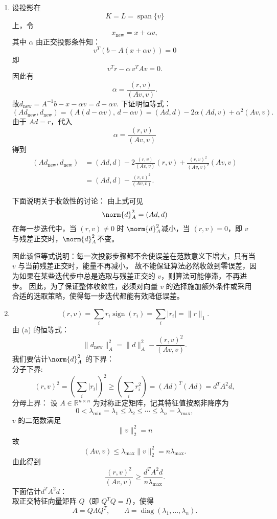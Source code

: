 \documentclass{ctexart}
\begin{document}
\begin{solution}
  \begin{enumerate}
\item 设投影在
\[
K = L = \operatorname{span}\{v\}
\]
上，令
\[
x_{\text{new}} = x + \alpha v,
\]
其中 \(\alpha\) 由正交投影条件知：
\[
v^{T}(b - A(x + \alpha v)) = 0
\]
即\[
v^{T}r - \alpha\, v^{T}Av = 0.
\]
因此有
\[
\alpha = \frac{(r, v)}{(Av, v)}.
\]
故\(d_{\text{new}}=A^{-1} b -x - \alpha v=d-\alpha v \).
下证明恒等式：
\[
(Ad_{\text{new}}, d_{\text{new}})
= (A(d - \alpha v),\, d - \alpha v)
= (Ad, d) - 2\alpha(Ad, v) + \alpha^2 (Av, v).
\]
由于 \(Ad = r\)，代入
\[
\alpha = \frac{(r, v)}{(Av, v)}
\]
得到
\[
\begin{aligned}
(Ad_{\text{new}}, d_{\text{new}})
&= (Ad, d) - 2 \frac{(r, v)}{(Av, v)} (r, v) + \frac{(r, v)^2}{(Av, v)^2} (Av, v) \\[6pt]
&= (Ad, d) - \frac{(r, v)^2}{(Av, v)}.
\end{aligned}
\]

下面说明关于收敛性的讨论：
由上式可见
\[
\norm{d} _A^2 = (Ad, d)
\]
在每一步迭代中，当 \((r, v) \neq 0\) 时 \(\norm{d}_{A}^2  \)减小，当 \((r, v) = 0\)，即 \(v\) 与残差正交时，\(\norm{d}_A^2 \)不变。

因此该恒等式说明：每一次投影步骤都不会使误差在范数意义下增大，只有当 \(v\) 与当前残差正交时，能量不再减小。
故不能保证算法必然收敛到零误差，因为如果在某些迭代步中总是选取与残差正交的 \(v\)，则算法可能停滞，不再进步。
因此，为了保证整体收敛性，必须对向量 \(v\) 的选择施加额外条件或采用合适的选取策略，使得每一步迭代都能有效降低误差。
\item 
\[
(r,v) = \sum_i r_i \operatorname{sign}(r_i)
= \sum_i |r_i|
= \lVert r \rVert_1.
\]
由 (a) 的恒等式：
\[
\lVert d_{\mathrm{new}} \rVert_A^2 
= \lVert d \rVert_A^2 
- \frac{(r,v)^2}{(A v, v)}.
\]
我们要估计\(\norm{d}_A^2 \) 的下界：\\
分子下界:
\[
(r,v)^2 
= (\sum_i |r_i|)^2 \geq (\sum_{i} r_i^2)
= (A d)^T (A d) = d^T A^2 d,
\]
分母上界：
设 \(A\in\mathbb R^{n\times n}\) 为对称正定矩阵，记其特征值按照非降序为
\[
0<\lambda_{\min}=\lambda_1\le \lambda_2\le\cdots\le\lambda_n=\lambda_{\max},
\]
$v$ 的二范数满足
\[
\lVert v \rVert_2^2 = n
\]
故
\[
(A v, v) \le \lambda_{\max}\lVert v \rVert_2^2 = n\lambda_{\max}.
\]
由此得到
\[
\frac{(r,v)^2}{(A v,v)} 
\ge \frac{d^T A^2 d}{n \lambda_{\max}}.
\]
下面估计\(d^TA^2d \)：\\
取正交特征向量矩阵 \(Q\)（即 \(Q^TQ=I\)），使得
\[
A = Q\Lambda Q^T,\qquad \Lambda=\operatorname{diag}(\lambda_1,\dots,\lambda_n).
\]


\end{enumerate}
\end{solution}
\end{document}
